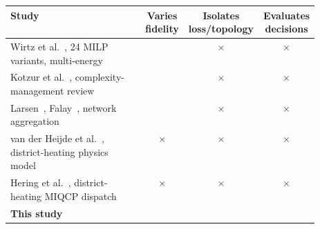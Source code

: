 \documentclass[a4paper,fleqn]{cas-sc} %
\renewcommand{\checkmark}{\ding{51}} %
\begin{document}
{\begin{table}[t]
\setlength{\tabcolsep}{5pt}
\begin{tabular}{@{}p{0.52\linewidth}ccc@{}}
\toprule
Study & \makecell{Varies\\fidelity} & \makecell{Isolates\\loss/topology} & \makecell{Evaluates\\decisions} \\
\midrule
Wirtz et al.~\cite{Wirtz2021_complexity}, 24 MILP variants, multi-energy & \checkmark & $\times$ & $\times$ \\
Kotzur et al.~\cite{Kotzur2021}, complexity-management review & \checkmark & $\times$ & $\times$ \\
Larsen~\cite{Larsen2004}, Falay~\cite{Falay2020}, network aggregation & \checkmark & $\times$ & $\times$ \\
van der Heijde et al.~\cite{vanderHeijde2017}, district-heating physics model & $\times$ & $\times$ & $\times$ \\
Hering et al.~\cite{Hering2021}, district-heating MIQCP dispatch & $\times$ & $\times$ & $\times$ \\
\textbf{This study} & \checkmark & \checkmark & \checkmark \\
\bottomrule
\end{tabular}
\end{table}


}
\end{document}
